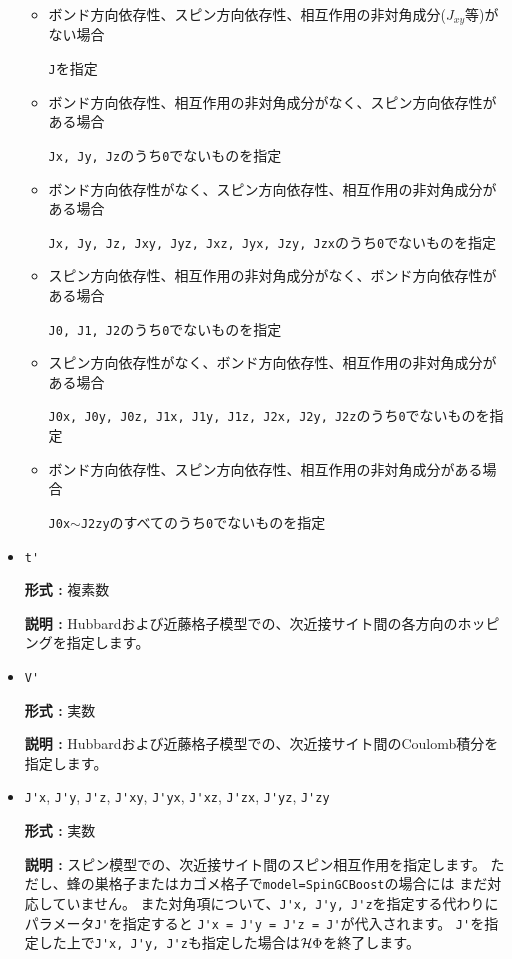 \begin{itemize}
\begin{itemize}

\item ボンド方向依存性、スピン方向依存性、相互作用の非対角成分($J_{x y}$等)がない場合

\verb|J|を指定

\item ボンド方向依存性、相互作用の非対角成分がなく、スピン方向依存性がある場合

\verb|Jx, Jy, Jz|のうち\verb|0|でないものを指定

\item ボンド方向依存性がなく、スピン方向依存性、相互作用の非対角成分がある場合

\verb|Jx, Jy, Jz, Jxy, Jyz, Jxz, Jyx, Jzy, Jzx|のうち\verb|0|でないものを指定

\item スピン方向依存性、相互作用の非対角成分がなく、ボンド方向依存性がある場合

\verb|J0, J1, J2|のうち\verb|0|でないものを指定

\item スピン方向依存性がなく、ボンド方向依存性、相互作用の非対角成分がある場合

\verb|J0x, J0y, J0z, J1x, J1y, J1z, J2x, J2y, J2z|のうち\verb|0|でないものを指定

\item ボンド方向依存性、スピン方向依存性、相互作用の非対角成分がある場合

\verb|J0x|$\sim$\verb|J2zy|のすべてのうち\verb|0|でないものを指定

\end{itemize}
\item \verb|t'|

{\bf 形式 :} 複素数

{\bf 説明 :} Hubbardおよび近藤格子模型での、次近接サイト間の各方向のホッピングを指定します。

\item \verb|V'|

{\bf 形式 :} 実数

{\bf 説明 :} Hubbardおよび近藤格子模型での、次近接サイト間のCoulomb積分を指定します。

\item \verb|J'x|, \verb|J'y|, \verb|J'z|, \verb|J'xy|, 
  \verb|J'yx|, \verb|J'xz|, \verb|J'zx|, \verb|J'yz|, \verb|J'zy|

{\bf 形式 :} 実数

{\bf 説明 :} スピン模型での、次近接サイト間のスピン相互作用を指定します。
ただし、蜂の巣格子またはカゴメ格子で\verb|model=SpinGCBoost|の場合には
まだ対応していません。
また対角項について、\verb|J'x, J'y, J'z|を指定する代わりに
パラメータ\verb|J'|を指定すると
\verb|J'x = J'y = J'z = J'|が代入されます。
\verb|J'|を指定した上で\verb|J'x, J'y, J'z|も指定した場合は$\mathcal{H} \Phi$を終了します。
\end{itemize}

